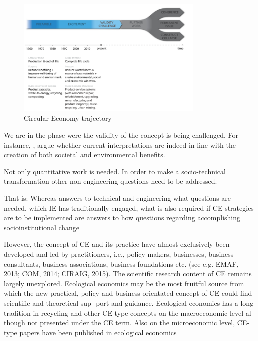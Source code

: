\begin{figure}[h!]
    \centering
    \includegraphics[width=0.8\textwidth]{sections/asset/ce_fork.PNG}
    \caption{Circular Economy trajectory}
    \label{fig:ce_trajectory}
\end{figure}


We are in the phase were the validity of the concept is being challenged. For instance, \parencite{Gregson2015,Gregson2015,Murray2017}, argue whether current interpretations are indeed in line with the creation of both societal and environmental benefits.

Not only quantitative work is needed. In order to make a socio-technical transformation other non-engineering questions need to be addressed. 

That is: Whereas answers to technical and engineering what questions are needed, which IE has traditionally engaged, what is also required if CE strategies are to be implemented are answers to how questions regarding accomplishing socioinstitutional change


\textcite{Korhonen2018a} However, the concept of CE and its practice have almost exclusively been developed and led by practitioners, i.e., policy-makers, businesses, business consultants, business associations, business foundations etc. (see e.g. EMAF, 2013; COM, 2014; CIRAIG, 2015). The scientific research content of CE remains largely unexplored. Ecological economics may be the most fruitful source from which the new practical, policy and business orientated concept of CE could find scientific and theoretical sup- port and guidance. Ecological economics has a long tradition in recycling and other CE-type concepts on the macroeconomic level al- though not presented under the CE term. Also on the microeconomic level, CE-type papers have been published in ecological economics



